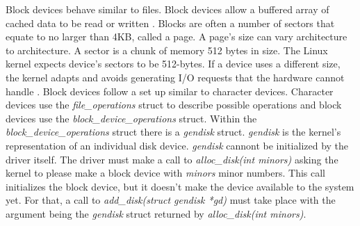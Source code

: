\documentclass[onecolumn,draftclsnofoot, 10pt, compsoc]{IEEEtran}
\begin{document}
			Block devices behave similar to files. Block devices allow a buffered array of cached data to be read or written \cite{deviceLinuxMolly}.
			Blocks are often a number of sectors that equate to no larger than 4KB, called a page. 
			A page's size can vary architecture to architecture. 
			A sector is a chunk of memory 512 bytes in size. 
			The Linux kernel expects device's sectors to be 512-bytes.
			If a device uses a different size, the kernel adapts and avoids generating I/O requests that the hardware cannot handle \cite{implLinuxBlock}.
			Block devices follow a set up similar to character devices.
			Character devices use the \textit{file\_operations} struct to describe possible operations and block devices use the \textit{block\_device\_operations} struct.
			Within the \textit{block\_device\_operations} struct there is a \textit{gendisk} struct.
			\textit{gendisk} is the kernel's representation of an individual disk device.
			\textit{gendisk} cannont be initialized by the driver itself.
			The driver must make a call to \textit{alloc\_disk(int minors)} asking the kernel to please make a block device with \textit{minors} minor numbers.
			This call initializes the block device, but it doesn't make the device available to the system yet.
			For that, a call to \textit{add\_disk(struct gendisk *gd)} must take place with the argument being the 	\textit{gendisk} struct returned by \textit{alloc\_disk(int minors)}.
	
\end{document}
